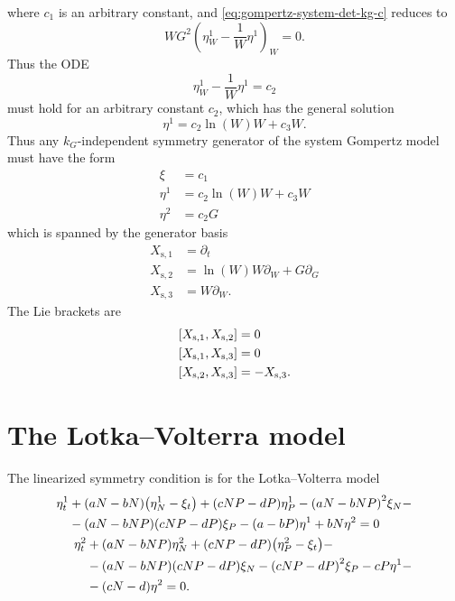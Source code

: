 where \(c_1\) is an arbitrary constant, and \cref{eq:gompertz-system-det-kg-c} reduces to
\begin{equation}
  W G^2 \left(\eta^1_W - \frac{1}{W} \eta^1 \right)_W = 0.
\end{equation}
Thus the ODE
\begin{equation}
  \eta^1_W - \frac{1}{W} \eta^1 = c_2
\end{equation}
must hold for an arbitrary constant \(c_2\), which has the general solution
\begin{equation}
  \eta^1 = c_2 \ln(W) W + c_3 W.
\end{equation}
Thus any \(k_G\)-independent symmetry generator of the system Gompertz model  must have the form
\begin{align}
  \xi &= c_1 \\
  \eta^1 &= c_2 \ln(W) W + c_3 W\\
  \eta^2 &= c_2 G
\end{align}
which is spanned by the generator basis
\begin{align}
  X_{\text{s},1} &= \partial_t \\
  X_{\text{s},2} &= \ln(W) W \partial_W + G \partial_G \\
  X_{\text{s},3} &= W \partial_W.
\end{align}
The Lie brackets are
\begin{align}
  \comm{X_{\text{s},1}}{X_{\text{s},2}} &= 0 \\
  \comm{X_{\text{s},1}}{X_{\text{s},3}} &= 0 \\
  \comm{X_{\text{s},2}}{X_{\text{s},3}} &= -X_{\text{s},3}.
\end{align}

\section{The Lotka--Volterra model}

The linearized symmetry condition  is for the Lotka--Volterra model
\begin{subequations}\label{eq:lotka-volterra-lin-symmetry-cond}
  \begin{align}
    \begin{split}
      \eta^1_t &+ \qty(a N - b N) \qty(\eta^1_{N} - \xi_t) + \qty(c N P - d P) \eta^1_{P} - \qty(a N - b N P)^2 \xi_{N} -\\
      &- \qty(a N - b N P) \qty(c N P - d P) \xi_{P} - \qty(a - b P) \eta^1 + b N \eta^2 = 0
    \end{split}\\
    \begin{split}
      \eta^2_t &+ \qty(a N - b N P) \eta^2_{N} + \qty(c N P - d P) \qty(\eta^2_{P} - \xi_t) -\\
      &- \qty(a N - b N P) \qty(c N P - d P) \xi_{N} - \qty(c N P - d P)^2 \xi_{P} - c P \eta^1 -\\
      &- \qty(c N - d) \eta^2 = 0.
    \end{split}
  \end{align}
\end{subequations}

